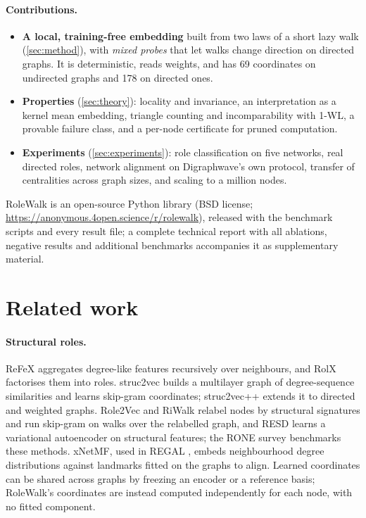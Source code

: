 \documentclass[10pt]{article}
\theoremstyle{definition}
\newcommand{\codeurl}{\url{https://anonymous.4open.science/r/rolewalk}}
\newcommand{\codeurl}{\url{https://github.com/kerighan/rolewalk}}
\begin{document}
\paragraph{Contributions.}
\begin{itemize}
\item \textbf{A local, training-free embedding} built from two laws of a short lazy walk (\cref{sec:method}), with \emph{mixed probes} that let walks change direction on directed graphs. It is deterministic, reads weights, and has 69 coordinates on undirected graphs and 178 on directed ones.
\item \textbf{Properties} (\cref{sec:theory}): locality and invariance, an interpretation as a kernel mean embedding, triangle counting and incomparability with 1-WL, a provable failure class, and a per-node certificate for pruned computation.
\item \textbf{Experiments} (\cref{sec:experiments}): role classification on five networks, real directed roles, network alignment on Digraphwave's own protocol, transfer of centralities across graph sizes, and scaling to a million nodes.
\end{itemize}
RoleWalk is an open-source Python library (BSD license; \codeurl), released with the benchmark scripts and every result file; a complete technical report with all ablations, negative results and additional benchmarks accompanies it as supplementary material.

\section{Related work}

\paragraph{Structural roles.}
ReFeX \citep{henderson2011} aggregates degree-like features recursively over neighbours, and RolX \citep{henderson2012} factorises them into roles.
struc2vec \citep{ribeiro2017} builds a multilayer graph of degree-sequence similarities and learns skip-gram coordinates; struc2vec++ \citep{steenfatt2018} extends it to directed and weighted graphs.
Role2Vec \citep{ahmed2018} and RiWalk \citep{ma2019riwalk} relabel nodes by structural signatures and run skip-gram on walks over the relabelled graph, and RESD \citep{resd} learns a variational autoencoder on structural features; the RONE survey \citep{rone} benchmarks these methods.
xNetMF, used in REGAL \citep{heimann2018}, embeds neighbourhood degree distributions against landmarks fitted on the graphs to align.
Learned coordinates can be shared across graphs by freezing an encoder or a reference basis; RoleWalk's coordinates are instead computed independently for each node, with no fitted component.
\end{document}
